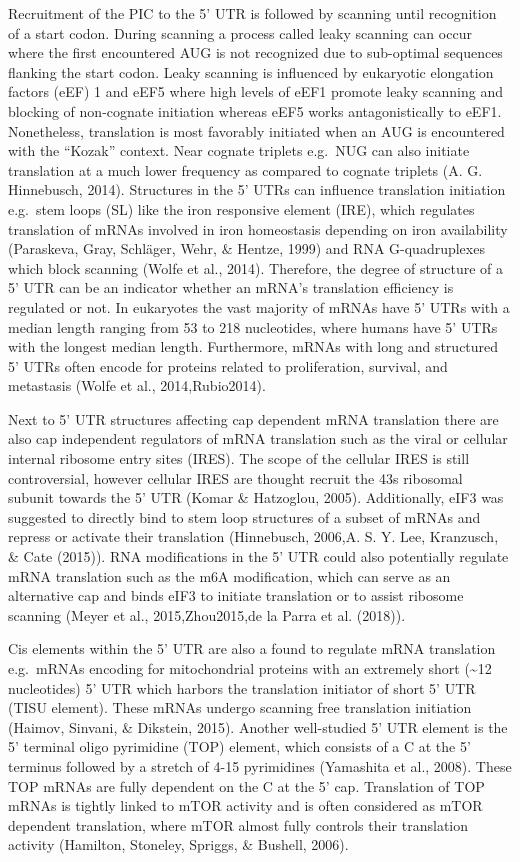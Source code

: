 \documentclass[12pt,openany]{book}
\begin{document}
Recruitment of the PIC to the 5' UTR is followed by scanning until
recognition of a start codon. During scanning a process called leaky
scanning can occur where the first encountered AUG is not recognized due
to sub-optimal sequences flanking the start codon. Leaky scanning is
influenced by eukaryotic elongation factors (eEF) 1 and eEF5 where high
levels of eEF1 promote leaky scanning and blocking of non-cognate
initiation whereas eEF5 works antagonistically to eEF1. Nonetheless,
translation is most favorably initiated when an AUG is encountered with
the ``Kozak'' context. Near cognate triplets e.g.~NUG can also initiate
translation at a much lower frequency as compared to cognate triplets
(A. G. Hinnebusch, 2014). Structures in the 5' UTRs can influence
translation initiation e.g.~stem loops (SL) like the iron responsive
element (IRE), which regulates translation of mRNAs involved in iron
homeostasis depending on iron availability (Paraskeva, Gray, Schläger,
Wehr, \& Hentze, 1999) and RNA G-quadruplexes which block scanning
(Wolfe et al., 2014). Therefore, the degree of structure of a 5' UTR can
be an indicator whether an mRNA's translation efficiency is regulated or
not. In eukaryotes the vast majority of mRNAs have 5' UTRs with a median
length ranging from 53 to 218 nucleotides, where humans have 5' UTRs
with the longest median length. Furthermore, mRNAs with long and
structured 5' UTRs often encode for proteins related to proliferation,
survival, and metastasis (Wolfe et al., 2014,Rubio2014).

Next to 5' UTR structures affecting cap dependent mRNA translation there
are also cap independent regulators of mRNA translation such as the
viral or cellular internal ribosome entry sites (IRES). The scope of the
cellular IRES is still controversial, however cellular IRES are thought
recruit the 43s ribosomal subunit towards the 5' UTR (Komar \&
Hatzoglou, 2005). Additionally, eIF3 was suggested to directly bind to
stem loop structures of a subset of mRNAs and repress or activate their
translation (Hinnebusch, 2006,A. S. Y. Lee, Kranzusch, \& Cate (2015)).
RNA modifications in the 5' UTR could also potentially regulate mRNA
translation such as the m6A modification, which can serve as an
alternative cap and binds eIF3 to initiate translation or to assist
ribosome scanning (Meyer et al., 2015,Zhou2015,de la Parra et al.
(2018)).

Cis elements within the 5' UTR are also a found to regulate mRNA
translation e.g.~mRNAs encoding for mitochondrial proteins with an
extremely short (\textasciitilde{}12 nucleotides) 5' UTR which harbors
the translation initiator of short 5' UTR (TISU element). These mRNAs
undergo scanning free translation initiation (Haimov, Sinvani, \&
Dikstein, 2015). Another well-studied 5' UTR element is the 5' terminal
oligo pyrimidine (TOP) element, which consists of a C at the 5' terminus
followed by a stretch of 4-15 pyrimidines (Yamashita et al., 2008).
These TOP mRNAs are fully dependent on the C at the 5' cap. Translation
of TOP mRNAs is tightly linked to mTOR activity and is often considered
as mTOR dependent translation, where mTOR almost fully controls their
translation activity (Hamilton, Stoneley, Spriggs, \& Bushell, 2006).
\end{document}
